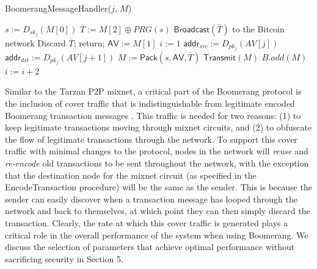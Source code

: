 \begin{algorithm}[t!]
\caption{{\sf BoomerangMessageHandler}($j$, $M$)}
\label{alg:handler}
\begin{algorithmic}[1]

\State $s := D_{sk_{j}}(M[0])$
\State $\bar{T} := M[2] \oplus PRG(s)$
	\State $\mathsf{Broadcast}(\bar{T})$ to the Bitcoin network
	\State Discard $\bar{T}$; return;
\Else
	\State $\mathsf{AV} := M[1]$
	\State $i := 1$
		\State $\mathsf{addr}_{src} := D_{pk_j}(AV[j])$
			\State $\mathsf{addr}_{dst} := D_{pk_j}(AV[j + 1])$
			\State $M := \mathsf{Pack}(s, \mathsf{AV}, \bar{T})$
				\State $\mathsf{Transmit}(M)$
			\Else
				\State $B.add(M)$
			\EndIf
		\Else
			\State $i := i + 2$
		\EndIf
	\EndWhile
\EndIf

\end{algorithmic}
\end{algorithm}

Similar to the Tarzan P2P mixnet, a critical part of the Boomerang protocol is the inclusion of cover traffic that is indistinguishable from legitimate encoded Boomerang transaction messages \cite{tarzan}. This traffic is needed for two reasons: (1) to keep legitimate transactions moving through mixnet circuits, and (2) to obfuscate the flow of legitimate transactions through the network. To support this cover traffic with minimal changes to the protocol, nodes in the network will \emph{reuse} and \emph{re-encode} old transactions to be sent throughout the network, with the exception that the destination node for the mixnet circuit (as specified in the {\sf EncodeTransaction} procedure) will be the same as the sender. This is because the sender can easily discover when a transaction message has looped through the network and back to themselves, at which point they can then simply discard the transaction. Clearly, the rate at which this cover traffic is generated plays a critical role in the overall performance of the system when using Boomerang. We discuss the selection of parameters that achieve optimal performance without sacrificing security in Section 5. 

